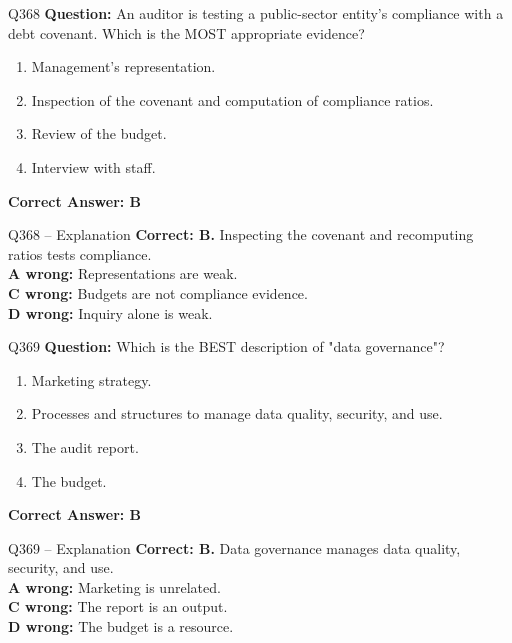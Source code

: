 \documentclass[aspectratio=169,10pt]{beamer}
\begin{document}
	\begin{frame}[t]{Q368}
		\small
		\textbf{Question:} An auditor is testing a public-sector entity's compliance with a debt covenant. Which is the MOST appropriate evidence?
		\begin{enumerate}[label=\Alph*.,itemsep=1pt,topsep=2pt]
			\item Management's representation.
			\item Inspection of the covenant and computation of compliance ratios.
			\item Review of the budget.
			\item Interview with staff.
		\end{enumerate}
		\vspace{4pt}
		\textbf{Correct Answer: B}
	\end{frame}
	
	\begin{frame}[t]{Q368 -- Explanation}
		\small
		\textbf{Correct: B.} Inspecting the covenant and recomputing ratios tests compliance. \\[4pt]
		\textbf{A wrong:} Representations are weak. \\[2pt]
		\textbf{C wrong:} Budgets are not compliance evidence. \\[2pt]
		\textbf{D wrong:} Inquiry alone is weak.
	\end{frame}
	
	\begin{frame}[t]{Q369}
		\small
		\textbf{Question:} Which is the BEST description of "data governance"?
		\begin{enumerate}[label=\Alph*.,itemsep=1pt,topsep=2pt]
			\item Marketing strategy.
			\item Processes and structures to manage data quality, security, and use.
			\item The audit report.
			\item The budget.
		\end{enumerate}
		\vspace{4pt}
		\textbf{Correct Answer: B}
	\end{frame}
	
	\begin{frame}[t]{Q369 -- Explanation}
		\small
		\textbf{Correct: B.} Data governance manages data quality, security, and use. \\[4pt]
		\textbf{A wrong:} Marketing is unrelated. \\[2pt]
		\textbf{C wrong:} The report is an output. \\[2pt]
		\textbf{D wrong:} The budget is a resource.
	\end{frame}
	
\end{document}

